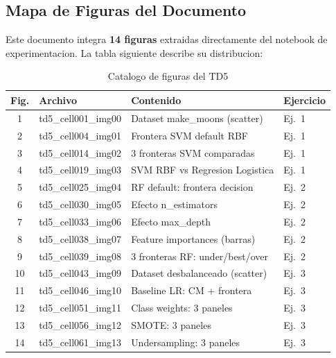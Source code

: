 \documentclass[12pt,a4paper]{article}
\begin{document}
\subsection*{Mapa de Figuras del Documento}

Este documento integra \textbf{14 figuras} extraidas directamente del notebook de experimentacion. La tabla siguiente describe su distribucion:

\begin{table}[H]
  \centering
  \caption{Catalogo de figuras del TD5}
  \label{tab:figuras}
  \begin{tabular}{clll}
    \toprule
    \textbf{Fig.} & \textbf{Archivo} & \textbf{Contenido} & \textbf{Ejercicio} \\
    \midrule
    1  & td5\_cell001\_img00 & Dataset make\_moons (scatter) & Ej.~1 \\
    2  & td5\_cell004\_img01 & Frontera SVM default RBF & Ej.~1 \\
    3  & td5\_cell014\_img02 & 3 fronteras SVM comparadas & Ej.~1 \\
    4  & td5\_cell019\_img03 & SVM RBF vs Regresion Logistica & Ej.~1 \\
    5  & td5\_cell025\_img04 & RF default: frontera decision & Ej.~2 \\
    6  & td5\_cell030\_img05 & Efecto n\_estimators & Ej.~2 \\
    7  & td5\_cell033\_img06 & Efecto max\_depth & Ej.~2 \\
    8  & td5\_cell038\_img07 & Feature importances (barras) & Ej.~2 \\
    9  & td5\_cell039\_img08 & 3 fronteras RF: under/best/over & Ej.~2 \\
    10 & td5\_cell043\_img09 & Dataset desbalanceado (scatter) & Ej.~3 \\
    11 & td5\_cell046\_img10 & Baseline LR: CM + frontera & Ej.~3 \\
    12 & td5\_cell051\_img11 & Class weights: 3 paneles & Ej.~3 \\
    13 & td5\_cell056\_img12 & SMOTE: 3 paneles & Ej.~3 \\
    14 & td5\_cell061\_img13 & Undersampling: 3 paneles & Ej.~3 \\
    \bottomrule
  \end{tabular}
\end{table}

\newpage

\end{document}
